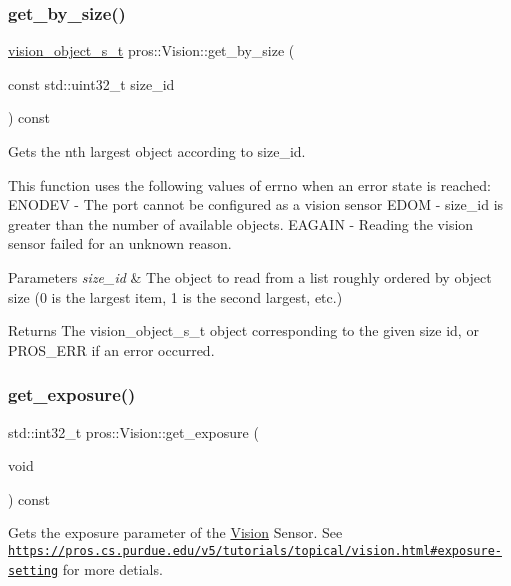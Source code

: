 \subsubsection{\texorpdfstring{get\+\_\+by\+\_\+size()}{get\_by\_size()}}
{\footnotesize\ttfamily \hyperlink{vision_8h_ae619120558539c13e53b5a6f42fb4375}{vision\+\_\+object\+\_\+s\+\_\+t} pros\+::\+Vision\+::get\+\_\+by\+\_\+size (\begin{DoxyParamCaption}\item[{const std\+::uint32\+\_\+t}]{size\+\_\+id }\end{DoxyParamCaption}) const}

Gets the nth largest object according to size\+\_\+id.

This function uses the following values of errno when an error state is reached\+: E\+N\+O\+D\+EV -\/ The port cannot be configured as a vision sensor E\+D\+OM -\/ size\+\_\+id is greater than the number of available objects. E\+A\+G\+A\+IN -\/ Reading the vision sensor failed for an unknown reason.


\begin{DoxyParams}{Parameters}
{\em size\+\_\+id} & The object to read from a list roughly ordered by object size (0 is the largest item, 1 is the second largest, etc.)\\
\hline
\end{DoxyParams}
\begin{DoxyReturn}{Returns}
The vision\+\_\+object\+\_\+s\+\_\+t object corresponding to the given size id, or P\+R\+O\+S\+\_\+\+E\+RR if an error occurred. 
\end{DoxyReturn}
\mbox{\label{classpros_1_1Vision_a80552b2897b8edcdb68bc56477213f2e}} 
\subsubsection{\texorpdfstring{get\+\_\+exposure()}{get\_exposure()}}
{\footnotesize\ttfamily std\+::int32\+\_\+t pros\+::\+Vision\+::get\+\_\+exposure (\begin{DoxyParamCaption}\item[{void}]{ }\end{DoxyParamCaption}) const}

Gets the exposure parameter of the \hyperlink{classpros_1_1Vision}{Vision} Sensor. See \href{https://pros.cs.purdue.edu/v5/tutorials/topical/vision.html#exposure-setting}{\tt https\+://pros.\+cs.\+purdue.\+edu/v5/tutorials/topical/vision.\+html\#exposure-\/setting} for more detials.

